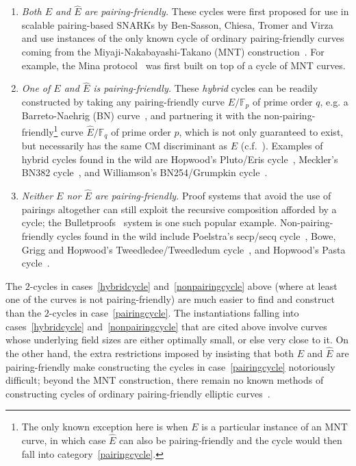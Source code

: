 \documentclass[version=preprint]{iacrcc}
\newcommand{\F}{\mathbb{F}}
\begin{document}
\begin{enumerate}[label=(\roman*)]
\item {\it Both $E$ and $\hat{E}$ are pairing-friendly.}\label{pairingcycle} These cycles were first proposed for use in scalable pairing-based SNARKs by Ben{-}Sasson, Chiesa, Tromer and Virza~\cite{scalable} and use instances of the only known cycle of ordinary pairing-friendly curves coming from the Miyaji-Nakabayashi-Takano (MNT) construction~\cite{MNT,DBLP:conf/ants/KarabinaT08}. For example, the Mina protocol~\cite{mina} was first built on top of a cycle of MNT curves. 
\vspace{0.3cm}
\item {\it One of $E$ and $\hat{E}$ is pairing-friendly.}\label{hybridcycle}  These \emph{hybrid} cycles can be readily constructed by taking any pairing-friendly curve $E/\F_p$ of prime order $q$, e.g. a Barreto-Naehrig (BN) curve~\cite{BNcurveViray}, and partnering it with the non-pairing-friendly\footnote{The only known exception here is when $E$ is a particular instance of an MNT curve, in which case $\hat{E}$ can also be pairing-friendly and the cycle would then fall into category~\ref{pairingcycle}.} curve $\hat{E}/\F_q$ of prime order $p$, which is not only guaranteed to exist, but necessarily has the same CM discriminant as $E$ (c.f.~\cite{silvermanstange}). Examples of hybrid cycles found in the wild are Hopwood's Pluto/Eris cycle~\cite{pluto-eris}, Meckler's BN382 cycle~\cite{BN382}, and Williamson's BN254/Grumpkin cycle~\cite{goblinplonk}.
\vspace{0.3cm}
\item {\it Neither $E$ nor $\hat{E}$ are pairing-friendly.}\label{nonpairingcycle} Proof systems that avoid the use of pairings altogether can still exploit the recursive composition afforded by a cycle; the Bulletproofs~\cite{bulletproofs} system is one such popular example. Non-pairing-friendly cycles found in the wild include Poelstra's secp/secq cycle~\cite{secpsecq}, Bowe, Grigg and Hopwood's Tweedledee/Tweedledum cycle~\cite{BoweGH19}, and Hopwood's Pasta cycle~\cite{pasta}.
\end{enumerate} 

The $2$-cycles in cases~\ref{hybridcycle} and~\ref{nonpairingcycle} above (where at least one of the curves is not pairing-friendly) are much easier to find and construct than the $2$-cycles in case~\ref{pairingcycle}. The instantiations falling into cases~\ref{hybridcycle} and~\ref{nonpairingcycle} that are cited above involve curves whose underlying field sizes are either optimally small, or else very close to it. On the other hand, the extra restrictions imposed by insisting that both $E$ and $\hat{E}$ are pairing-friendly make constructing the cycles in case~\ref{pairingcycle} notoriously difficult; beyond the MNT construction, there remain no known methods of constructing cycles of ordinary pairing-friendly elliptic curves~\cite{chiesa2019cycles,revisitingcycles,primepairs}.
\end{document}
